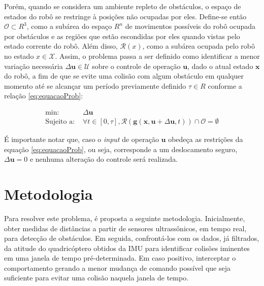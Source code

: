\documentclass[a4paper, 12pt]{article}
\begin{document}
Porém, quando se considera um ambiente repleto de obstáculos, o espaço de estados do robô se restringe à posições não ocupadas por eles. Define-se então $\mathcal{O} \subset R^3$, como a subárea do espaço $R^n$ de movimentos possíveis do robô ocupada por obstáculos e as regiões que estão escondidas por eles quando vistas pelo estado corrente do robô. Além disso, $\mathcal{R}(x)$, como a subárea ocupada pelo robô no estado $x \in \mathcal{X}$. Assim, o problema passa a ser definido como identificar a menor variação necessária  $\Delta\mathbf{u} \in \mathcal{U}$ sobre o controle de operação $\mathbf{u}$, dado o atual estado $\mathbf{x}$ do robô, a fim de que se evite uma colisão com algum obstáculo em qualquer momento até se alcançar um período previamente definido $\tau \in R$ conforme a relação \ref{eq:equacaoProb}:

\begin{equation}
\begin{aligned}
\text{min: }& \Delta\mathbf{u} \\
\text{Sujeito a: }& \forall t \in [0,\tau], \mathcal{R}(\mathbf{g}(\mathbf{x}, \mathbf{u}+\Delta\mathbf{u}, t)) \cap \mathcal{O} = \emptyset
\end{aligned}
\label{eq:equacaoProb}
\end{equation}



É importante notar que, caso o \textit{input} de operação $\mathbf{u}$ obedeça as restrições da equação \ref{eq:equacaoProb}, ou seja, corresponde a um deslocamento seguro, $\Delta\mathbf{u} = 0$ e nenhuma alteração do controle será realizada.

\newpage

\section{Metodologia}
\label{sec:meto}

Para resolver este problema, é proposta a seguinte metodologia. Inicialmente, obter medidas de distâncias a partir de sensores ultrassônicos, em tempo real, para detecção de obstáculos. Em seguida, confrontá-los com os dados, já filtrados, da atitude do quadricóptero obtidos da IMU para identificar colisões iminentes em uma janela de tempo pré-determinada. Em caso positivo, interceptar o comportamento gerando a menor mudança de comando possível que seja suficiente para evitar uma colisão naquela janela de tempo.
\end{document}

